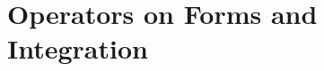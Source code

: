 \documentclass[../main]{subfiles}
\begin{document}
\chapter{Operators on Forms and Integration}\label{ch07}









\end{document}

